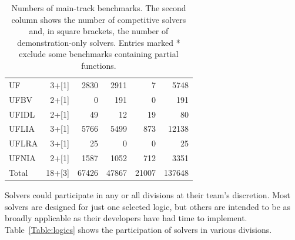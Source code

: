 \documentclass[twoside,11pt]{article}
\begin{document}
\begin{table}
\begin{tabular}{|l|r|r|r|r|r|}
UF & 3+[1] & 2830 & 2911 & 7 & 5748 \\
UFBV & 2+[1] & 0 & 191 & 0 & 191 \\
UFIDL & 2+[1] & 49 & 12 & 19 & 80 \\
UFLIA & 3+[1] & 5766 & 5499 & 873 & 12138 \\
UFLRA & 3+[1] & 25 & 0 & 0 & 25\\
UFNIA & 2+[1] & 1587 & 1052 & 712 & 3351 \\
\hline
Total & 18+[3] & 67426 & 47867 & 21007 & 137648 \\
\hline
\end{tabular}
\vspace{.2in}
\caption{Numbers of main-track benchmarks. The second column shows the number of competitive solvers and, in square brackets, the number of demonstration-only solvers. Entries marked * exclude some benchmarks containing partial functions.}
\label{Table:benchmarks}
\end{table}

Solvers could participate in any or all divisions at their team's discretion. Most solvers are designed for just one selected logic, but others are intended to be as broadly applicable as their developers have had time to implement. Table~\ref{Table:logics} shows the participation of solvers in various divisions.
\end{document}
